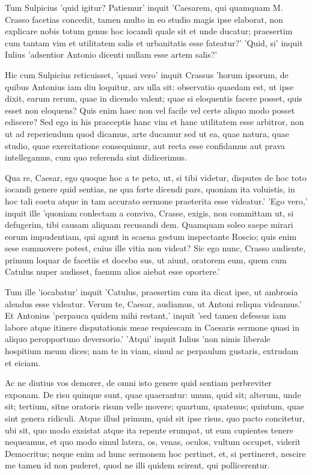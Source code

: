  Tum Sulpicius 'quid igitur? Patiemur' inquit 'Caesarem, qui quamquam M. Crasso facetias concedit, tamen multo in eo studio magis ipse elaborat, non explicare nobis totum genus hoc iocandi quale sit et unde ducatur; praesertim cum tantam vim et utilitatem salis et urbanitatis esse fateatur?' 'Quid, si' inquit Iulius 'adsentior Antonio dicenti nullam esse artem salis?'

 Hic cum Sulpicius reticuisset, 'quasi vero' inquit Crassus 'horum ipsorum, de quibus Antonius iam diu loquitur, ars ulla sit: observatio quaedam est, ut ipse dixit, earum rerum, quae in dicendo valent; quae si eloquentis facere posset, quis esset non eloquens? Quis enim haec non vel facile vel certe aliquo modo posset ediscere? Sed ego in his praeceptis hanc vim et hanc utilitatem esse arbitror, non ut ad reperiendum quod dicamus, arte ducamur sed ut ea, quae natura, quae studio, quae exercitatione consequimur, aut recta esse confidamus aut prava intellegamus, cum quo referenda sint didicerimus.

 Qua re, Caesar, ego quoque hoc a te peto, ut, si tibi videtur, disputes de hoc toto iocandi genere quid sentias, ne qua forte dicendi pars, quoniam ita voluistis, in hoc tali coetu atque in tam accurato sermone praeterita esse videatur.' 'Ego vero,' inquit ille 'quoniam conlectam a conviva, Crasse, exigis, non committam ut, si defugerim, tibi causam aliquam recusandi dem. Quamquam soleo saepe mirari eorum impudentiam, qui agunt in scaena gestum inspectante Roscio; quis enim sese commovere potest, cuius ille vitia non videat? Sic ego nunc, Crasso audiente, primum loquar de facetiis et docebo sus, ut aiunt, oratorem eum, quem cum Catulus nuper audisset, faenum alios aiebat esse oportere.'

 Tum ille 'iocabatur' inquit 'Catulus, praesertim cum ita dicat ipse, ut ambrosia alendus esse videatur. Verum te, Caesar, audiamus, ut Antoni reliqua videamus.' Et Antonius 'perpauca quidem mihi restant,' inquit 'sed tamen defessus iam labore atque itinere disputationis meae requiescam in Caesaris sermone quasi in aliquo peropportuno deversorio.' 'Atqui' inquit Iulius 'non nimis liberale hospitium meum dices; nam te in viam, simul ac perpaulum gustaris, extrudam et eiciam.

 Ac ne diutius vos demorer, de omni isto genere quid sentiam perbreviter exponam. De risu quinque sunt, quae quaerantur: unum, quid sit; alterum, unde sit; tertium, sitne oratoris risum velle movere; quartum, quatenus; quintum, quae sint genera ridiculi. Atque illud primum, quid sit ipse risus, quo pacto concitetur, ubi sit, quo modo exsistat atque ita repente erumpat, ut eum cupientes tenere nequeamus, et quo modo simul latera, os, venas, oculos, vultum occupet, viderit Democritus; neque enim ad hunc sermonem hoc pertinet, et, si pertineret, nescire me tamen id non puderet, quod ne illi quidem scirent, qui pollicerentur.

